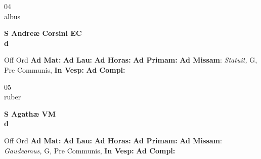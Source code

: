 \documentclass[10pt, openany]{book}
\begin{document}
    \begin{center}
        \begin{minipage}{3.5in}
            \vspace{2em}
            \begin{minipage}{0.5in}
                {\Huge 04} \\
                {\normalsize albus}
            \end{minipage}
            \begin{minipage}{3.0in}
                \textbf{ \large S Andreæ Corsini EC \\
                \textnormal{\normalsize d}}

            \end{minipage}
            \begin{justify}Off Ord
                \textbf{Ad Mat: }
                \textbf{Ad Lau: }
                \textbf{Ad Horas: }
                \textbf{Ad Primam: }\textbf{Ad Missam}: \textit{Statuit,} G, Pre Communis, 
                \textbf{In Vesp: }
                \textbf{Ad Compl: }
            \end{justify}
        \end{minipage}
    \end{center}

    \begin{center}
        \begin{minipage}{3.5in}
            \vspace{2em}
            \begin{minipage}{0.5in}
                {\Huge 05} \\
                {\normalsize ruber}
            \end{minipage}
            \begin{minipage}{3.0in}
                \textbf{ \large S Agathæ VM \\
                \textnormal{\normalsize d}}

            \end{minipage}
            \begin{justify}Off Ord
                \textbf{Ad Mat: }
                \textbf{Ad Lau: }
                \textbf{Ad Horas: }
                \textbf{Ad Primam: }\textbf{Ad Missam}: \textit{Gaudeamus,} G, Pre Communis, 
                \textbf{In Vesp: }
                \textbf{Ad Compl: }
            \end{justify}
        \end{minipage}
    \end{center}
\end{document}
